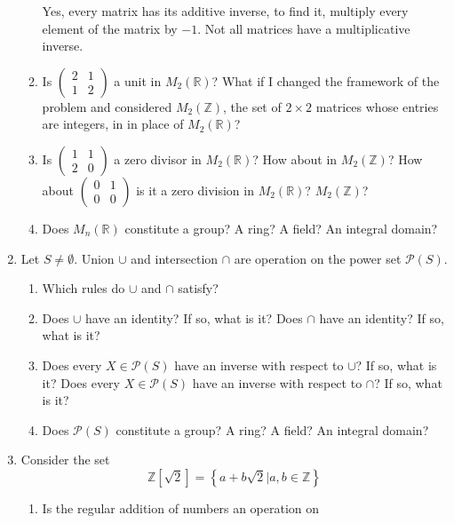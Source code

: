 \documentclass[10pt]{amsart}
\begin{document}
\begin{enumerate}
\begin{enumerate}[listparindent=0.7cm]
        Yes, every matrix has its additive inverse, to find it, multiply every
        element of the matrix by $-1$. Not all matrices have a multiplicative
        inverse.
      \item Is $\begin{pmatrix}2 & 1 \\ 1 & 2\end{pmatrix}$ a unit in
        $M_2(\mathbb{R})$? What if I changed the framework of the problem and
        considered $M_2(\mathbb{Z})$, the set of $2\times 2$ matrices whose
        entries are integers, in in place of $M_2(\mathbb{R})$?
      \item Is $\begin{pmatrix}1&1\\2&0\end{pmatrix}$ a zero divisor in
        $M_2(\mathbb{R})$? How about in $M_2(\mathbb{Z})$? How about
        $\begin{pmatrix}0&1\\0&0\end{pmatrix}$ is it a zero division in
        $M_2(\mathbb{R})$? $M_2(\mathbb{Z})$?
      \item Does $M_n(\mathbb{R})$ constitute a group? A ring? A field? An
        integral domain?
    \end{enumerate}
  \item Let $S\neq \emptyset$. Union $\cup$ and intersection $\cap$ are
    operation on the power set $\mathcal{P}(S)$.
    \begin{enumerate}[listparindent=0.7cm]
      \item Which rules do $\cup$ and $\cap$ satisfy?
      \item Does $\cup$ have an identity? If so, what is it? Does $\cap$ have
        an identity? If so, what is it?
      \item Does every $X\in\mathcal{P}(S)$ have an inverse with respect to
        $\cup$? If so, what is it? Does every $X\in\mathcal{P}(S)$ have an
        inverse with respect to $\cap$? If so, what is it?
      \item Does $\mathcal{P}(S)$ constitute a group? A ring? A field? An
        integral domain?
    \end{enumerate}
  \item Consider the set
    \[\mathbb{Z}\left[\sqrt{2}\right]=\left\{a+b\sqrt{2}|a,b\in\mathbb{Z}\right\}\]
    \begin{enumerate}[listparindent=0.7cm]
      \item Is the regular addition of numbers an operation on

\end{enumerate}
\end{enumerate}
\end{document}
